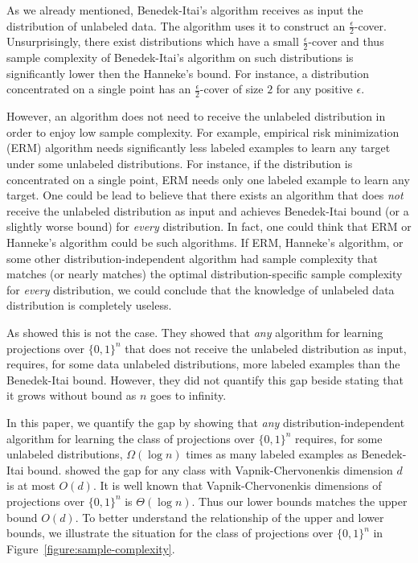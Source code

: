 \documentclass[11pt]{article}
\begin{document}
As we already mentioned, Benedek-Itai's algorithm receives as input the
distribution of unlabeled data. The algorithm uses it to construct an
$\frac{\epsilon}{2}$-cover. Unsurprisingly, there exist distributions which have
a small $\frac{\epsilon}{2}$-cover and thus sample complexity of Benedek-Itai's
algorithm on such distributions is significantly lower then the Hanneke's bound.
For instance, a distribution concentrated on a single point has an
$\frac{\epsilon}{2}$-cover of size $2$ for any positive $\epsilon$.

However, an algorithm does not need to receive the unlabeled distribution in
order to enjoy low sample complexity. For example, empirical risk minimization
(ERM) algorithm needs significantly less labeled examples to learn any target
under some unlabeled distributions. For instance, if the distribution is
concentrated on a single point, ERM needs only one labeled example to learn any
target. One could be lead to believe that there exists an algorithm that does
\emph{not} receive the unlabeled distribution as input and achieves Benedek-Itai
bound (or a slightly worse bound) for \emph{every} distribution. In fact, one
could think that ERM or Hanneke's algorithm could be such algorithms. If ERM,
Hanneke's algorithm, or some other distribution-independent algorithm had sample
complexity that matches (or nearly matches) the optimal distribution-specific
sample complexity for \emph{every} distribution, we could conclude that the
knowledge of unlabeled data distribution is completely useless.

As \citet{Darnstadt-Simon-Szorenyi-2013} showed this is not the case. They showed
that \emph{any} algorithm for learning projections over $\{0,1\}^n$ that does
not receive the unlabeled distribution as input, requires, for some data
unlabeled distributions, more labeled examples than the Benedek-Itai bound.
However, they did not quantify this gap beside stating that it grows without
bound as $n$ goes to infinity.

In this paper, we quantify the gap by showing that \emph{any}
distribution-independent algorithm for learning the class of projections over
$\{0,1\}^n$ requires, for some unlabeled distributions, $\Omega(\log n)$ times
as many labeled examples as Benedek-Itai bound.
\citet{Darnstadt-Simon-Szorenyi-2013} showed the gap for any class with
Vapnik-Chervonenkis dimension $d$ is at most $O(d)$. It is well known that
Vapnik-Chervonenkis dimensions of projections over $\{0,1\}^n$ is $\Theta(\log
n)$. Thus our lower bounds matches the upper bound $O(d)$. To better understand
the relationship of the upper and lower bounds, we illustrate the situation for
the class of projections over $\{0,1\}^n$ in
Figure~\ref{figure:sample-complexity}.
\end{document}
